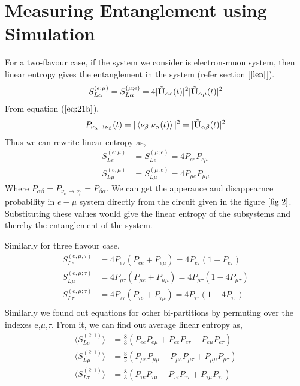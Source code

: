 \documentclass[12pt,a4paper]{report}
\begin{document}
\section{Measuring Entanglement using Simulation}
For a two-flavour case, if the system we consider is electron-muon system, then linear entropy gives the entanglement in the system (refer section [$\ref{len}$]).
\begin{equation*}
    S_{L\alpha}^{(e;\mu)} = S_{L\alpha}^{(\mu;e)}=4|\Tilde{\textbf{U}}_{\alpha e}(t)|^{2}|\Tilde{\textbf{U}}_{\alpha \mu}(t)|^{2}
\end{equation*}
From equation ($\ref{eq:21b}$),
\begin{equation*}
P_{\nu_{\alpha} \rightarrow \nu_{\beta}}(t) = |\braket{\nu_{\beta}|\nu_{\alpha}(t)}|^{2} = |\Tilde{\textbf{U}}_{\alpha\beta}(t)|^{2}
\end{equation*}
Thus we can rewrite linear entropy as,
\begin{equation}
\begin{split}
\label{eq:27}
    S_{Le}^{(e;\mu)}& = S_{Le}^{(\mu;e)}=4 P_{ee}P_{e\mu}\\
    S_{L\mu}^{(e;\mu)}& = S_{L\mu}^{(\mu;e)}=4 P_{\mu e}P_{\mu\mu}
\end{split}
\end{equation}
Where $P_{\alpha \beta} = P_{\nu_{\alpha}\rightarrow\nu_{\beta}} = P_{\beta \alpha}$. We can get the apperance and disappearnce probability in $e-\mu$ system directly from the circuit given in the figure $\ref{fig 2}$. Substituting these values would give the linear entropy of the subsystems and thereby the entanglement of the system.\par
Similarly for three flavour case, 
\begin{equation}
\begin{split}
 S_{Le}^{(e,\mu;\tau)} &=4P_{e\tau}(P_{ee}+P_{e\mu})=4P_{e\tau}(1-P_{e\tau})\\
 S_{L\mu}^{(e,\mu;\tau)}& =4P_{\mu\tau}(P_{\mu e}+P_{\mu \mu})=4P_{\mu\tau}(1-4P_{\mu\tau})\\
 S_{L\tau}^{(e,\mu;\tau)}& =4P_{\tau\tau}(P_{\tau e}+P_{\tau \mu})=4P_{\tau\tau}(1-4P_{\tau\tau})\\
 \end{split}
\end{equation}
Similarly we found out equations for other bi-partitions by permuting over the indexes e,$\mu$,$\tau$.
From it, we can find out average linear entropy as,
\begin{equation}
\label{eq:28}
\begin{split}
    \langle S_{L e}^{(2:1)}\rangle &= \frac{8}{3}(P_{ee}P_{e\mu}+P_{ee}P_{e\tau}+P_{e\mu}P_{e\tau})\\
    \langle S_{L \mu}^{(2:1)}\rangle &= \frac{8}{3}(P_{\mu e}P_{\mu \mu}+P_{\mu e}P_{\mu\tau}+P_{\mu\mu}P_{\mu\tau})\\  
    \langle S_{L \tau}^{(2:1)}\rangle &= \frac{8}{3}(P_{\tau e}P_{\tau \mu}+P_{\tau e}P_{\tau\tau}+P_{\tau\mu}P_{\tau\tau})\\
    \end{split}
\end{equation}
\end{document}
